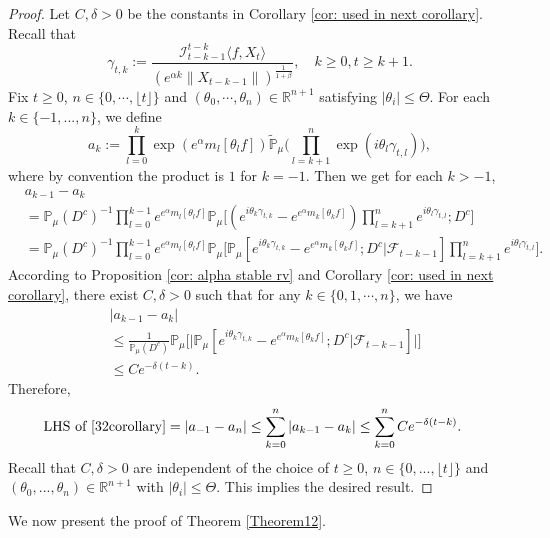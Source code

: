 \documentclass[12pt,a4paper]{amsart}
\theoremstyle{plain}
\theoremstyle{definition}
\numberwithin{equation}{section}
\begin{document}
\begin{proof}
	Let $C,\delta > 0$ be the constants in Corollary \ref{cor: used in next corollary}.
    Recall that \[\gamma_{t,k}:=\frac {\mathcal I_{t-k-1}^{t-k}\langle f ,X_t\rangle}{(e^{\alpha k}\|X_{t-k-1}\|)^\frac{1}{1+\beta}},\quad k \geq 0, t\geq k+1. \]
    Fix $t\geq 0$, $n \in \{0, \cdots, \lfloor t \rfloor\}$ and $(\theta_0, \cdots, \theta_n)\in \mathbb R^{n+1}$
    satisfying $|\theta_i|\leq \Theta$.
    For each $k\in\{-1,...,n\}$, we define
    \[a_k:=\prod_{l=0}^{k}\exp(e^{\alpha}m_l[\theta_lf])\mathbb{\tilde{P}}_{\mu}\Big(\prod_{l=k+1}^{n}\exp\left(i\theta_l\gamma_{t,l}\right)\Big),\]
     where by convention the product is $1$ for $k=-1$. Then we get for each $k > -1$,
    \begin{align*}
        &a_{k-1} - a_k
        \\&=\mathbb{P}_{\mu}(D^c)^{-1}\prod_{l=0}^{k-1}e^{e^{\alpha}m_l[\theta_l f]}\mathbb{P}_{\mu}\Big[(e^{i\theta_{k}\gamma_{t,k}}-e^{e^{\alpha}m_k[\theta_k f]})\prod_{l=k+1}^ne^{i\theta_{l}\gamma_{t,l}};D^c\Big]
        \\&=\mathbb{P}_{\mu}(D^c)^{-1}\prod_{l=0}^{k-1}e^{e^{\alpha}m_l[\theta_l f]}\mathbb{P}_{\mu}\Big[\mathbb P_\mu[e^{i\theta_{k}\gamma_{t,k}}-e^{e^{\alpha}m_k[\theta_k f]}; D^c|\mathscr F_{t-k-1}]\prod_{l=k+1}^ne^{i\theta_{l}\gamma_{t,l}}\Big].
    \end{align*}
  According to Proposition \ref{cor: alpha stable rv} and Corollary \ref{cor: used in next corollary},
    there exist $C,\delta>0$ such that for any
    $k\in\{0, 1, \cdots, n\}$, we have
    \begin{align*}
        &|a_{k-1}- a_k|
        \\&\leq \frac{1}{\mathbb{P}_{\mu}(D^c)}\mathbb{P}_{\mu}\Big[\big|\mathbb P_\mu[e^{i\theta_{k}\gamma_{t,k}}-e^{e^{\alpha}m_k[\theta_k f]}; D^c\big|\mathscr{F}_{t-k-1}]\big|\Big]
        \\& \leq C e^{-\delta(t-k)}.
    \end{align*}
Therefore,
\begin{equation}\begin{split}
    \text{LHS of \eqref{32corollary}}&= \left|a_{-1}-a_n\right|
    \leq\sum_{k=0}^n\left|a_{k-1}-a_k\right|
    \leq \sum_{k=0}^n C e^{-\delta(t-k)}.
\end{split}\end{equation}
	Recall that $C, \delta>0$ are independent of the choice of $t\geq 0$, $n \in \{0,...,\lfloor t \rfloor\}$ and $(\theta_0,...,\theta_n)\in \mathbb R^{n+1}$ with $|\theta_i|\leq \Theta$.
    This implies the desired result.
\end{proof}
We now present the proof of Theorem \ref{Theorem12}.
\bigskip
\end{document}

